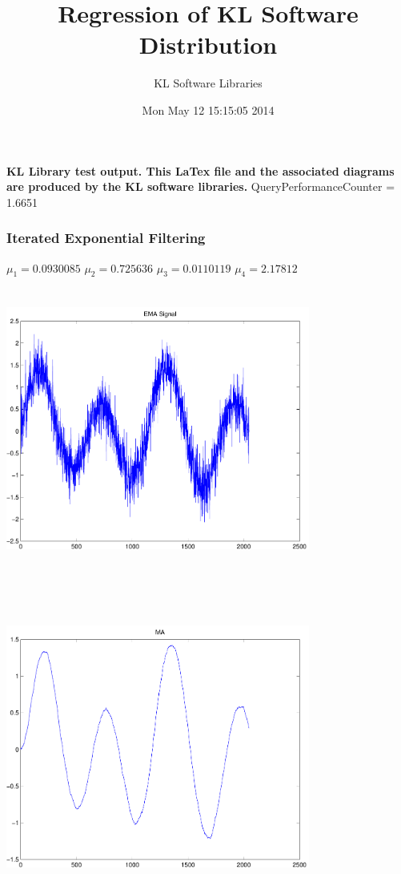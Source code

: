 \documentclass[9pt]{article}
\theoremstyle{plain}
\theoremstyle{definition}
\theoremstyle{remark}
\numberwithin{equation}{section}
\begin{document}
\title{Regression of KL Software Distribution   }
\author{KL Software Libraries}
\date{Mon May 12 15:15:05 2014
}
\maketitle
\textbf{ KL Library test output.  This LaTex file and the associated diagrams are produced by the KL software libraries.}
QueryPerformanceCounter  =  1.6651
\subsubsection{Iterated Exponential Filtering }
$\mu_1 =0.0930085$
$\mu_2 =0.725636$
$\mu_3 =0.0110119$
$\mu_4 =2.17812$
\includegraphics[width=10.0cm,height=10.0cm]{EMA_signal.pdf}

\includegraphics[width=10.0cm,height=10.0cm]{MA.pdf}
\end{document}
